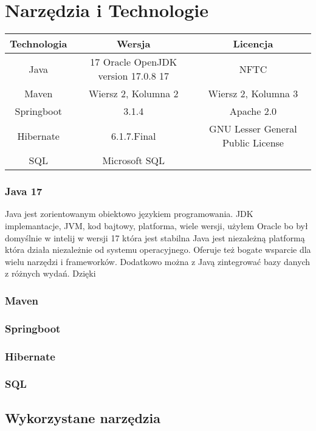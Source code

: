 \chapter{Narzędzia i Technologie}



\begin{tabular}{|c|c|c|}
    \hline
    Technologia & Wersja & Licencja \\
    \hline
    Java & 17 Oracle OpenJDK version 17.0.8 17 &  NFTC\\
    \hline
    Maven & Wiersz 2, Kolumna 2 & Wiersz 2, Kolumna 3 \\
    \hline
    Springboot & 3.1.4 & Apache 2.0\\
    \hline
    Hibernate & 6.1.7.Final & GNU Lesser General Public License \\
    \hline
		SQL & Microsoft SQL & \\
    \hline
\end{tabular}


\subsection{Java 17}
Java jest zorientowanym obiektowo językiem programowania. JDK implemantacje, JVM, kod bajtowy, platforma, wiele wersji, użyłem Oracle bo był domyślnie w intelij w wersji 17 która jest stabilna
Java jest niezależną platformą która działa niezależnie od systemu operacyjnego. Oferuje też bogate wsparcie dla wielu narzędzi i frameworków. Dodatkowo można z Javą zintegrować bazy danych z różnych wydań. Dzięki 

\subsection{Maven}

\subsection{Springboot}
\subsection{Hibernate}
\subsection{SQL}


\section{Wykorzystane narzędzia}

